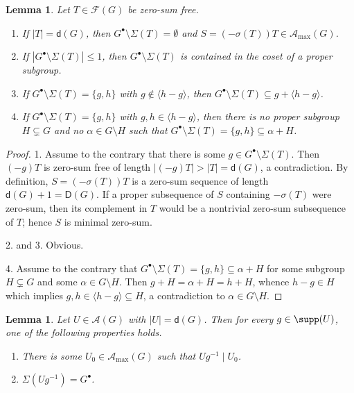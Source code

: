\documentclass[a4paper, 10pt]{amsart}
\theoremstyle{plain}
\newtheorem{lemma}[theorem]{\bf Lemma}
\theoremstyle{definition}
\numberwithin{equation}{section}
\begin{document}
\begin{lemma}\label{2.3}
Let $T \in \mathcal F (G)$ be zero-sum free.
\begin{enumerate}
\item  If  $|T|=\mathsf d (G)$, then $G^{\bullet} \setminus \Sigma (T)= \emptyset$ and $S = (-\sigma (T))T \in \mathcal A_{\max}(G)$.

\item If $|G^{\bullet} \setminus \Sigma (T)| \le 1$, then $G^{\bullet} \setminus \Sigma (T)$ is contained in the coset of a proper subgroup.

\item If $G^{\bullet}\setminus \Sigma (T)=\{g,h\}$ with $g \notin \langle h-g \rangle$, then $G^{\bullet}\setminus \Sigma (T)\subseteq g+\langle h-g \rangle$. 

\item If  $G^{\bullet}\setminus \Sigma (T)=\{g,h\}$ with $g, h  \in \langle h-g \rangle$, then there is no proper subgroup $H \subsetneq G$ and no $\alpha\in G\setminus H$  such that $G^{\bullet}\setminus \Sigma (T)=\{g,h\}\subseteq \alpha+H $.
\end{enumerate}  
\end{lemma}

\begin{proof}
1. 	Assume to the contrary that there is some $g \in G^{\bullet} \setminus \Sigma (T)$. Then $(-g)T$ is zero-sum free of length $|(-g)T| > |T| = \mathsf d (G)$, a contradiction. By definition, $S = (-\sigma (T))T $ is a  zero-sum sequence of length $\mathsf d (G)+1 = \mathsf D (G)$. If a proper subsequence of $S$ containing $-\sigma(T)$ were zero-sum, then its complement in $T$ would be a nontrivial zero-sum subsequence of $T$; hence $S$ is minimal zero-sum.

2. and 3. Obvious. 

4. Assume to the contrary that $G^{\bullet}\setminus \Sigma (T)=\{g,h\}\subseteq \alpha+H $ for some subgroup $H  \subsetneq G$ and some $\alpha\in G\setminus H$. Then $g+H=\alpha+H = h+H$,  whence $h-g \in H $ which implies  $g, h  \in \langle h-g \rangle\subseteq  H$, a contradiction to $\alpha\in G\setminus H$.
\end{proof}


\begin{lemma}\label{2.4}
Let $U\in \mathcal A(G)$ with $|U|=\mathsf d (G)$. Then for every $g \in \supp ( U)$, one of the following properties holds.
\begin{enumerate}
\item[(a)]  There is  some $U_0\in \mathcal A_{\max}(G)$ such that $Ug^{-1}\mid U_0$.
		
\item[(b)] $\Sigma (Ug^{-1})=G^{\bullet}$.
\end{enumerate}
\end{lemma}
\end{document}
